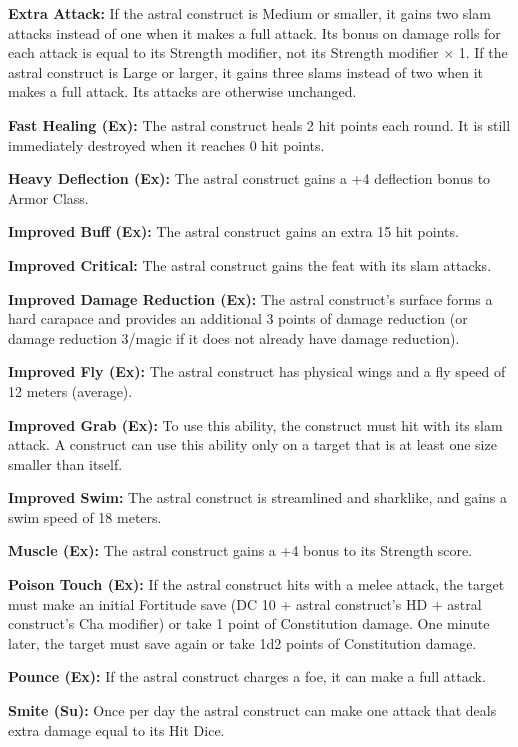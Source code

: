 {	\textbf{Extra Attack:} If the astral construct is Medium or smaller, it gains two slam attacks instead of one when it makes a full attack. Its bonus on damage rolls for each attack is equal to its Strength modifier, not its Strength modifier $\times$ 1\onehalf. If the astral construct is Large or larger, it gains three slams instead of two when it makes a full attack. Its attacks are otherwise unchanged.

	\textbf{Fast Healing (Ex):} The astral construct heals 2 hit points each round. It is still immediately destroyed when it reaches 0 hit points.

	\textbf{Heavy Deflection (Ex):} The astral construct gains a +4 deflection bonus to Armor Class.

	\textbf{Improved Buff (Ex):} The astral construct gains an extra 15 hit points.

	\textbf{Improved Critical:} The astral construct gains the  feat with its slam attacks.

	\textbf{Improved Damage Reduction (Ex):} The astral construct's surface forms a hard carapace and provides an additional 3 points of damage reduction (or damage reduction 3/magic if it does not already have damage reduction).

	\textbf{Improved Fly (Ex):} The astral construct has physical wings and a fly speed of 12 meters (average).

	\textbf{Improved Grab (Ex):} To use this ability, the construct must hit with its slam attack. A construct can use this ability only on a target that is at least one size smaller than itself.

	\textbf{Improved Swim:} The astral construct is streamlined and sharklike, and gains a swim speed of 18 meters.

	\textbf{Muscle (Ex):} The astral construct gains a +4 bonus to its Strength score.

	\textbf{Poison Touch (Ex):} If the astral construct hits with a melee attack, the target must make an initial Fortitude save (DC 10 + \onehalf astral construct's HD + astral construct's Cha modifier) or take 1 point of Constitution damage. One minute later, the target must save again or take 1d2 points of Constitution damage.

	\textbf{Pounce (Ex):} If the astral construct charges a foe, it can make a full attack.

	\textbf{Smite (Su):} Once per day the astral construct can make one attack that deals extra damage equal to its Hit Dice.

}
